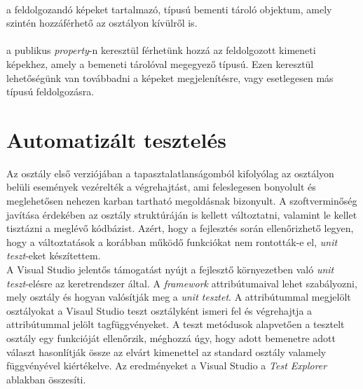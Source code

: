 \paragraph{} a feldolgozandó képeket tartalmazó,  típusú bementi tároló objektum, amely szintén hozzáférhető az osztályon kívülről is.

\paragraph{} a publikus \emph{property}-n keresztül férhetünk hozzá az feldolgozott kimeneti képekhez, amely a bemeneti tárolóval megegyező típusú. Ezen keresztül lehetőségünk van továbbadni a képeket megjelenítésre, vagy esetlegesen más típusú feldolgozásra.


\section{Automatizált tesztelés}

Az  osztály első verziójában a tapasztalatlanságomból kifolyólag az osztályon belüli események vezérelték a végrehajtást, ami feleslegesen bonyolult és meglehetősen nehezen karban tartható megoldásnak bizonyult. A szoftverminőség javítása érdekében az osztály struktúráján is kellett változtatni, valamint le kellet tisztázni a meglévő kódbázist. Azért, hogy a fejlesztés során ellenőrizhető legyen, hogy a változtatások a korábban működő funkciókat nem rontották-e el, \emph{unit teszt}-eket készítettem.\\
A Visual Studio jelentős támogatást nyújt a fejlesztő környezetben való \emph{unit teszt}-elésre az  keretrendszer által. A \emph{framework} attribútumaival lehet szabályozni, mely osztály és hogyan valósítják meg a \emph{unit tesztet}. A \code{[TestClass]} attribútummal megjelölt osztályokat a Visaul Studio teszt osztályként ismeri fel és végrehajtja a \code{[TestMethod]} attribútummal jelölt tagfüggvényeket. A teszt metódusok alapvetően a tesztelt osztály egy funkcióját ellenőrzik, méghozzá úgy, hogy adott bemenetre adott választ hasonlítják össze az elvárt kimenettel az  standard osztály valamely függvényével kiértékelve. Az eredményeket a Visual Studio a \emph{Test Explorer} ablakban összesíti.

